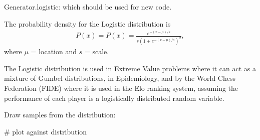 \documentclass[letterpaper,10pt,english]{sphinxmanual}
\begin{document}
\begin{fulllineitems}
\begin{description}
\end{description}

Generator.logistic: which should be used for new code.

The probability density for the Logistic distribution is
\begin{equation*}
\begin{split}P(x) = P(x) = \frac{e^{-(x-\mu)/s}}{s(1+e^{-(x-\mu)/s})^2},\end{split}
\end{equation*}
where \(\mu\) = location and \(s\) = scale.

The Logistic distribution is used in Extreme Value problems where it
can act as a mixture of Gumbel distributions, in Epidemiology, and by
the World Chess Federation (FIDE) where it is used in the Elo ranking
system, assuming the performance of each player is a logistically
distributed random variable.

Draw samples from the distribution:

\begin{sphinxVerbatim}[commandchars=\\\{\}]
    
    
   
     
\end{sphinxVerbatim}

\#   plot against distribution


\end{fulllineitems}
\end{document}
